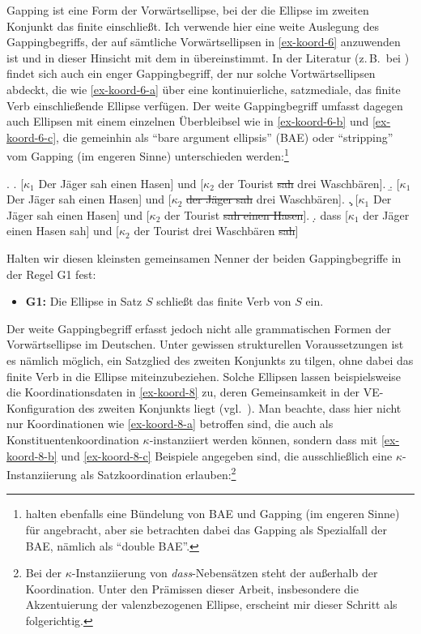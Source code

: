 Gapping ist eine Form der Vorwärtsellipse, bei der die Ellipse im zweiten Konjunkt das finite  einschlie\ss t. Ich verwende hier eine weite Auslegung des Gappingbegriffs, der auf sämtliche Vorwärtsellipsen in \ref{ex-koord-6} anzuwenden ist und in dieser Hinsicht mit dem in \citet[144]{Hartmann:00} übereinstimmt.  In der Literatur (z.\,B.\  bei \citealt{Ross:70,Jackendoff:71}) findet sich auch ein enger Gappingbegriff, der nur solche Vortwärtsellipsen abdeckt, die wie \ref{ex-koord-6-a} über eine kontinuierliche, satzmediale, das finite Verb einschlie\ss ende Ellipse verfügen. Der weite Gappingbegriff umfasst dagegen auch Ellipsen mit einem einzelnen Überbleibsel wie in \ref{ex-koord-6-b} und \ref{ex-koord-6-c}, die gemeinhin als "`bare argument ellipsis"' (BAE) oder "`stripping"' vom Gapping (im engeren Sinne) unterschieden werden:\footnote{\citet[275f]{Culicover:Jackendoff:05} halten ebenfalls eine Bündelung von BAE und Gapping (im engeren Sinne) für angebracht, aber sie betrachten dabei das Gapping als Spezialfall der BAE, nämlich als "`double BAE"'.}  

\ex. \label{ex-koord-6}
\a. \label{ex-koord-6-a}[$\kappa_1$ Der Jäger sah einen Hasen] und [$\kappa_2$ der Tourist \sout{sah} drei Waschbären].
\b. \label{ex-koord-6-b}[$\kappa_1$ Der Jäger sah einen Hasen] und [$\kappa_2$ \sout{der Jäger sah} drei Waschbären].
\c. \label{ex-koord-6-c}[$\kappa_1$ Der Jäger sah einen Hasen] und [$\kappa_2$ der Tourist \sout{sah einen Hasen}].
\d. \label{ex-koord-6-d} dass [$\kappa_1$ der Jäger einen Hasen sah] und [$\kappa_2$ der Tourist drei Waschbären \sout{sah}]

Halten wir diesen kleinsten gemeinsamen Nenner der beiden Gappingbegriffe in der Regel G1 fest:
\begin{itemize}
  \item[] {\bf G1:} Die Ellipse in Satz $S$ schlie\ss t das finite Verb von $S$ ein.
\end{itemize}
Der weite Gappingbegriff erfasst jedoch nicht alle grammatischen Formen der Vorwärtsellipse im Deutschen. Unter gewissen strukturellen Voraussetzungen ist es nämlich möglich, ein Satzglied des zweiten Konjunkts zu tilgen, ohne dabei das finite Verb in die Ellipse miteinzubeziehen. Solche Ellipsen lassen beispielsweise die Koordinationsdaten in \ref{ex-koord-8} zu, deren Gemeinsamkeit in der VE-Konfiguration des zweiten Konjunkts liegt (vgl.\ \citealt{Wilder:94,Wilder:97}). Man beachte, dass hier nicht nur Koordinationen wie \ref{ex-koord-8-a} betroffen sind, die auch als Konstituentenkoordination $\kappa$-instanziiert werden können, sondern dass mit \ref{ex-koord-8-b} und \ref{ex-koord-8-c} Beispiele angegeben sind, die ausschlie\ss lich eine $\kappa$-Instanziierung als Satzkoordination erlauben:\footnote{Bei der $\kappa$-Instanziierung von \emph{dass}-Nebensätzen steht der  au\ss erhalb der Koordination. Unter den Prämissen dieser Arbeit, insbesondere die Akzentuierung der valenzbezogenen Ellipse, erscheint mir dieser Schritt als folgerichtig.} 

